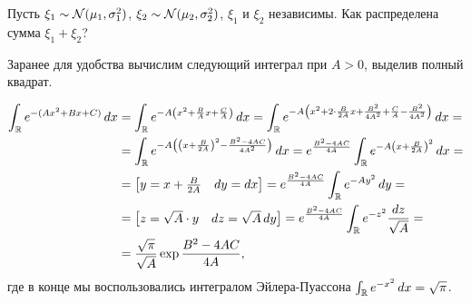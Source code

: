 \documentclass[../main.tex]{subfiles}
\begin{document}
\begin{exmpl}
 Пусть $ \xi_1 \sim \mathcal N(\mu_1,\sigma_1^{2}) $, $ \xi_2 \sim\mathcal N(\mu_2,\sigma_2^{2}) $, $ \xi_1 $ и $ \xi_2 $ независимы. Как распределена сумма $ \xi_1 + \xi_2 $?

 Заранее для удобства вычислим следующий интеграл при $ A > 0 $, выделив полный квадрат.

 \begin{align*}
  \int_{\mathbb{R}} e^{-(Ax^{2} + Bx + C)} \,dx &= \int_{\mathbb{R}} e^{-A\left(x^{2} + \frac{B}{A}x + \frac{C}{A}\right)} \,dx = \int_{\mathbb{R}} e^{-A\left(x^{2} + 2 \cdot \frac{B}{2A} x + \frac{B^{2}}{4A^{2}} + \frac{C}{A} - \frac{B^{2}}{4A^{2}}\right)} \,dx = \\
  &= \int_{\mathbb{R}}  e^{-A \left( \left( x + \frac{B}{2A} \right)^{2} - \frac{B^{2}-4AC}{4A^{2}} \right)}\,dx = e^{\frac{B^{2}-4AC}{4A}} \int_{\mathbb{R}} e^{-A \left( x + \frac{B}{2A} \right)^{2}} \,dx = \\
  &= \begin{bmatrix}
   y = x + \frac{B}{2A} & dy = dx
  \end{bmatrix} = e^{\frac{B^{2}-4AC}{4A}} \int_{\mathbb{R}} e^{-Ay^{2}}\,dy  = \\
  &= \begin{bmatrix}
   z = \sqrt A \cdot y & dz = \sqrt A \, dy
  \end{bmatrix} = e^{\frac{B^{2}-4AC}{4A}} \int_{\mathbb{R}} e^{-z^{2}} \frac{dz}{\sqrt A} = \\
  &= \frac{\sqrt \pi}{\sqrt A} \exp \frac{B^{2}-4AC}{4A},
 \end{align*} где в конце мы воспользовались интегралом Эйлера-Пуассона $ \int_{\mathbb{R}} e^{-x^{2}}\,dx = \sqrt \pi  $.
 

\end{exmpl}
\end{document}
